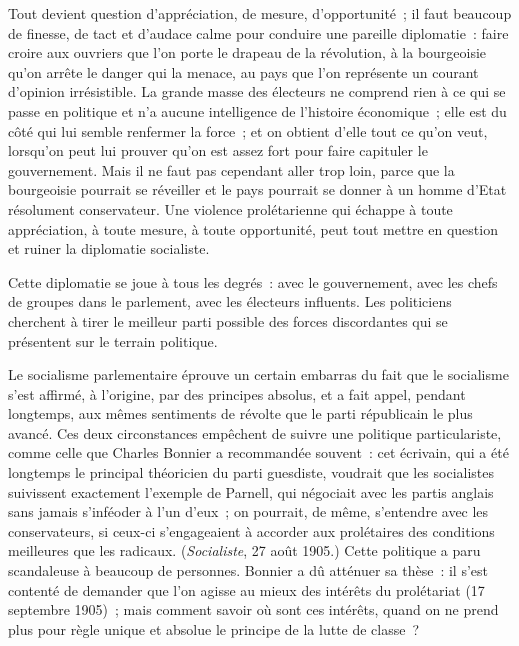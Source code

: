 \documentclass[french,twoside]{book} %
\begin{document}
Tout devient question d’appréciation, de mesure, d’opportunité ; il faut beaucoup de finesse, de tact et d’audace calme pour conduire une pareille diplomatie : faire croire aux ouvriers que l’on porte le drapeau de la révolution, à la bourgeoisie qu’on arrête le danger qui la menace, au pays que l’on représente un courant d’opinion irrésistible. La grande masse des électeurs ne comprend rien à ce qui se passe en politique et n’a aucune intelligence de l’histoire économique ; elle est du côté qui lui semble renfermer la force ; et on obtient d’elle tout ce qu’on veut, lorsqu’on peut lui prouver qu’on est assez fort pour faire capituler le gouvernement. Mais il ne faut pas cependant aller trop loin, parce que la bourgeoisie pourrait se réveiller et le pays pourrait se donner à un homme d’Etat résolument  conservateur. Une violence prolétarienne qui échappe à toute appréciation, à toute mesure, à toute opportunité, peut tout mettre en question et ruiner la diplomatie socialiste.\par
Cette diplomatie se joue à tous les degrés : avec le gouvernement, avec les chefs de groupes dans le parlement, avec les électeurs influents. Les politiciens cherchent à tirer le meilleur parti possible des forces discordantes qui se présentent sur le terrain politique.\par
Le socialisme parlementaire éprouve un certain embarras du fait que le socialisme s’est affirmé, à l’origine, par des principes absolus, et a fait appel, pendant longtemps, aux mêmes sentiments de révolte que le parti républicain le plus avancé. Ces deux circonstances empêchent de suivre une politique particulariste, comme celle que Charles Bonnier a recommandée souvent : cet écrivain, qui a été longtemps le principal théoricien du parti guesdiste, voudrait que les socialistes suivissent exactement l’exemple de Parnell, qui négociait avec les partis anglais sans jamais s’inféoder à l’un d’eux ; on pourrait, de même, s’entendre avec les conservateurs, si ceux-ci s’engageaient à accorder aux prolétaires des conditions meilleures que les radicaux. (\emph{Socialiste}, 27 août 1905.) Cette politique a paru scandaleuse à beaucoup de personnes. Bonnier a dû atténuer sa thèse : il s’est contenté de demander que l’on agisse au mieux des intérêts du prolétariat (17 septembre 1905) ; mais comment savoir où sont ces intérêts, quand on ne prend plus pour règle unique et absolue le principe de la lutte de classe ?\par
\end{document}
